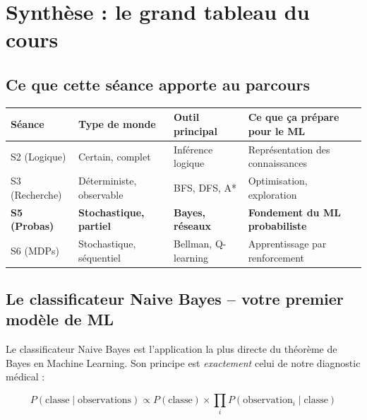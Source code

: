 \documentclass[11pt,a4paper]{article}
\begin{document}
\section{Synthèse : le grand tableau du cours}

\subsection{Ce que cette séance apporte au parcours}

\begin{center}
\begin{tabular}{lp{2.5cm}p{2.5cm}p{4cm}}
\toprule
\textbf{Séance} & \textbf{Type de monde} & \textbf{Outil principal} & \textbf{Ce que ça prépare pour le ML} \\
\midrule
S2 (Logique) & Certain, complet & Inférence logique & Représentation des connaissances \\
S3 (Recherche) & Déterministe, observable & BFS, DFS, A* & Optimisation, exploration \\
\textbf{S5 (Probas)} & \textbf{Stochastique, partiel} & \textbf{Bayes, réseaux} & \textbf{Fondement du ML probabiliste} \\
S6 (MDPs) & Stochastique, séquentiel & Bellman, Q-learning & Apprentissage par renforcement \\
\bottomrule
\end{tabular}
\end{center}

\subsection{Le classificateur Naive Bayes -- votre premier modèle de ML}

Le classificateur Naive Bayes est l'application la plus directe du théorème de Bayes en Machine Learning. Son principe est \textit{exactement} celui de notre diagnostic médical :

$$P(\text{classe} \mid \text{observations}) \propto P(\text{classe}) \times \prod_{i} P(\text{observation}_i \mid \text{classe})$$
\end{document}
